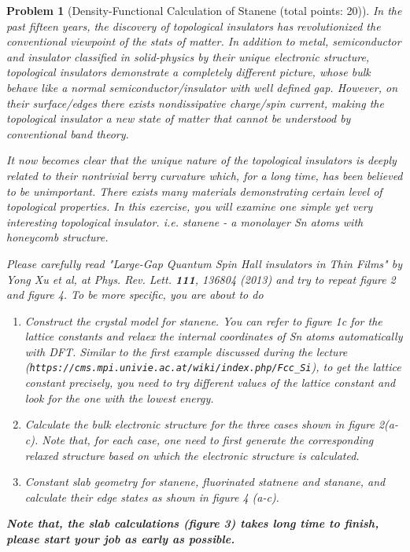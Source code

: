 \documentclass[UTF8,10pt,a4paper]{article}
\theoremstyle{Problem}
\newtheorem{prob}{Problem}
\theoremstyle{Solution}
\begin{document}
\thispagestyle{FirstPageStyle}
\begin{prob}[Density-Functional Calculation of Stanene (total points: 20)]
    In the past fifteen years, the discovery of topological insulators has revolutionized the conventional viewpoint of the stats of matter. In addition to metal, semiconductor and insulator classified in solid-physics by their unique electronic structure, topological insulators demonstrate a completely different picture, whose bulk behave like a normal semiconductor/insulator with well defined gap. However, on their surface/edges there exists nondissipative charge/spin current, making the topological insulator a new state of matter that cannot be understood by conventional band theory.

    It now becomes clear that the unique nature of the topological insulators is deeply related to their nontrivial berry curvature which, for a long time, has been believed to be unimportant. There exists many materials demonstrating certain level of topological properties. In this exercise, you will examine one simple yet very interesting topological insulator. \textit{i.e.} stanene - a monolayer Sn atoms with honeycomb structure.

    Please carefully read "Large-Gap Quantum Spin Hall insulators in Thin Films" by Yong Xu et al, at Phys. Rev. Lett. \textbf{111}, 136804 (2013) and try to repeat figure 2 and figure 4. To be more specific, you are about to do
    \begin{enumerate}
        \item[1.] Construct the crystal model for stanene. You can refer to figure 1c for the lattice constants and relaex the internal coordinates of Sn atoms automatically with DFT. Similar to the first example discussed during the lecture (\verb|https://cms.mpi.univie.ac.at/wiki/index.php/Fcc_Si|), to get the lattice constant precisely, you need to try different values of the lattice constant and look for the one with the lowest energy.
        \item[2.] Calculate the bulk electronic structure for the three cases shown in figure 2(a-c). Note that, for each case, one need to first generate the corresponding relaxed structure based on which the electronic structure is calculated.
        \item[3.] Constant slab geometry for stanene, fluorinated statnene and stanane, and calculate their edge states as shown in figure 4 (a-c).
    \end{enumerate}
    \textbf{Note that, the slab calculations (figure 3) takes long time to finish, please start your job as early as possible.}
\end{prob}
\end{document}
